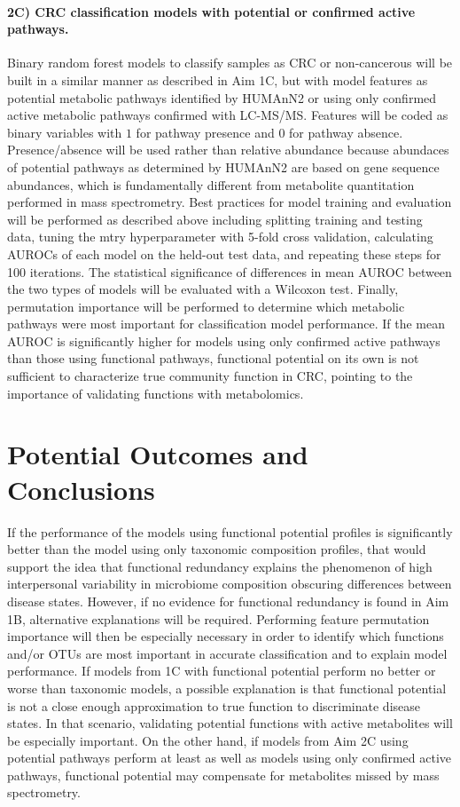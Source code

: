 \documentclass[11pt]{article}
\begin{document}
\paragraph{2C) CRC classification models with potential or confirmed active pathways.}

Binary random forest models to classify samples as CRC or non-cancerous will be built in a similar manner as described in Aim 1C, but with model features as potential metabolic pathways identified by HUMAnN2 or using only confirmed active metabolic pathways confirmed with LC-MS/MS.
Features will be coded as binary variables with $1$ for pathway presence and $0$ for pathway absence.
Presence/absence will be used rather than relative abundance because abundaces of potential pathways as determined by HUMAnN2 are based on gene sequence abundances, which is fundamentally different from metabolite quantitation performed in mass spectrometry.
Best practices for model training and evaluation will be performed as described above including splitting training and testing data, tuning the mtry hyperparameter with 5-fold cross validation, calculating AUROCs of each model on the held-out test data, and repeating these steps for 100 iterations.
The statistical significance of differences in mean AUROC between the two types of models will be evaluated with a Wilcoxon test.
Finally, permutation importance will be performed to determine which metabolic pathways were most important for classification model performance.
If the mean AUROC is significantly higher for models using only confirmed active pathways than those using functional pathways,
functional potential on its own is not sufficient to characterize true community function in CRC,
pointing to the importance of validating functions with metabolomics.

\section*{Potential Outcomes and Conclusions}

If the performance of the models using functional potential profiles is significantly better than the model using only taxonomic composition profiles,
that would support the idea that functional redundancy explains the phenomenon of high interpersonal variability in microbiome composition obscuring differences between disease states.
However, if no evidence for functional redundancy is found in Aim 1B, alternative explanations will be required.
Performing feature permutation importance will then be especially necessary in order to identify which functions and/or OTUs are most important in accurate classification and to explain model performance.
If models from 1C with functional potential perform no better or worse than taxonomic models,
a possible explanation is that functional potential is not a close enough approximation to true function to discriminate disease states.
In that scenario, validating potential functions with active metabolites will be especially important.
On the other hand, if models from Aim 2C using potential pathways perform at least as well as models using only confirmed active pathways,
functional potential may compensate for metabolites missed by mass spectrometry.
\end{document}

